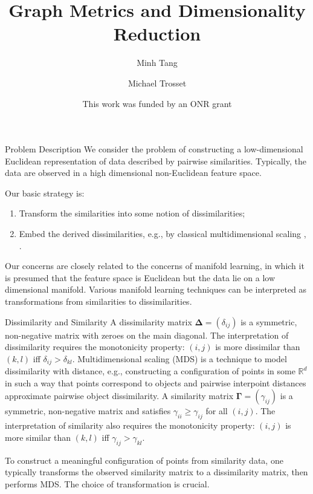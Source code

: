 \documentclass[professionalfonts,hyperref={pdfpagelabels=false,colorlinks=true,linkcolor=red}]{beamer}
\title[Graph Metrics and Dimensionality Reduction]{Graph Metrics and
  Dimensionality Reduction}
\author[Tang \& Trosset]{Minh Tang\inst{1} \and Michael
  Trosset\inst{2}}
\institute[Indiana University]{
  \inst{1} School of Informatics and Computing \\
  Indiana University, Bloomington
  \and \inst{2} Department of Statistics \\ Indiana University,
  Bloomington
}
\date[]{This work was funded by an ONR grant}
\begin{document}
\begin{frame}
\titlepage
\end{frame}

\begin{frame}{Problem Description}
  We consider the problem of constructing a low-dimensional Euclidean
  representation of data described by pairwise
  similarities. Typically, the data are observed in a high dimensional
  non-Euclidean feature space. 

 \vskip15pt Our basic strategy is:

  \begin{enumerate}
  \item Transform the similarities into some notion of dissimilarities;
  \item Embed the derived dissimilarities, e.g., by classical
    multidimensional scaling \cite{torgesen52:_multid},
    \cite{gower66:_some}.
  \end{enumerate}
  
Our concerns are closely related to the concerns of \alert{manifold
  learning}, in which it is presumed that the feature space is
Euclidean but the data lie on a low dimensional manifold. Various
manifold learning techniques can be interpreted as transformations
from similarities to dissimilarities. 
\end{frame}

\begin{frame}{Dissimilarity and Similarity}
  A \alert{dissimilarity matrix} $\bm{\Delta} = (\delta_{ij})$
  is a symmetric, non-negative matrix with zeroes on the main
  diagonal. The interpretation of dissimilarity requires the 
  monotonicity property: $(i,j)$ is more dissimilar than $(k,l)$ iff
  $\delta_{ij} > \delta_{kl}$.  
\vskip10pt \alert{Multidimensional scaling} (MDS) is a
  technique to model dissimilarity with distance, e.g., constructing a
  configuration of points in some $\mathbb{R}^{d}$ in
  such a way that points correspond to objects and pairwise interpoint
  distances approximate pairwise object dissimilarity.
\vskip10pt A \alert{similarity matrix} $\bm{\Gamma} =
  (\gamma_{ij})$ is a symmetric, non-negative matrix and satisfies
  $\gamma_{ii} \geq \gamma_{ij}$ for all $(i,j)$. The interpretation
  of similarity also requires the monotonicity property: $(i,j)$ is
  more similar than $(k,l)$ iff $\gamma_{ij} > \gamma_{kl}$. 
  
\vskip10pt To construct a meaningful configuration of points from
  similarity data, one typically transforms the observed similarity
  matrix to a dissimilarity matrix, then performs MDS. The choice of
  transformation is crucial.
\end{frame}
\end{document}
